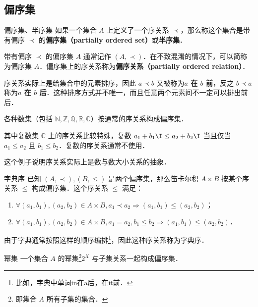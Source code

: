

\subsection{偏序集}

\begin{definition}{偏序集、半序集}
如果一个集合 $A$ 上定义了一个序关系 $\prec$，那么称这个集合是带有偏序 $\prec$ 的\textbf{偏序集（partially ordered set）}或\textbf{半序集}．
\end{definition}

带有偏序 $\prec$ 的偏序集 $A$ 通常记作 $(A,\prec)$．在不致混淆的情况下，可以简称为偏序集 $A$．偏序集上的序关系称为\textbf{偏序关系（partially ordered relation）}．

序关系实际上是给集合中的元素排序，因此 $a \prec b$ 又被称为\textbf{$a$ 在 $b$ 前}，反之 $b \prec a$ 称为\textbf{$a$ 在 $b$ 后}．这种排序方式并不唯一，而且任意两个元素间不一定可以排出前后．

\begin{example}{}
各种数集（包括 $\mathbb{N},\mathbb{Z},\mathbb{Q},\mathbb{R},\mathbb{C}$）按通常的序关系构成偏序集．

其中复数集 $\mathbb{C}$ 上的序关系比较特殊，复数 $a_1+b_1\I \leq a_2+b_2\I$ 当且仅当 $a_1\leq a_2$ 且 $b_1 \leq b_2$．复数的序关系通常不使用．
\end{example}

这个例子说明序关系实际上是数与数大小关系的抽象．

\begin{example}{字典序}\label{OrdRel_ex1}
已知 $(A,\prec),(B,\leq)$ 是两个偏序集，那么笛卡尔积 $A\times B$ 按某个序关系 $\leqslant$ 构成偏序集．这个序关系 $\leqslant$ 满足：
\begin{enumerate}
\item $\forall(a_1,b_1),(a_2,b_2) \in A\times B, a_1\prec a_2 \Rightarrow (a_1,b_1)\leqslant(a_2,b_2)$；
\item $\forall(a_1,b_1),(a_2,b_2) \in A\times B, a_1=a_2, b_1\leq b_2 \Rightarrow (a_1,b_1) \leqslant (a_2, b_2)$．
\end{enumerate}

由于字典通常按照这样的顺序编排\footnote{比如，字典中单词in在a后，在it前．}，因此这种序关系称为字典序．
\end{example}
\begin{example}{幂集}
一个集合 $A$ 的幂集\footnote{即集合 $A$ 所有子集的集合．}$2^X$ 与子集关系一起构成偏序集．
\end{example}

